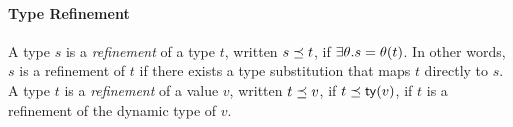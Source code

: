 \paragraph{Type Refinement}
A type $s$ is a \emph{refinement} of a type $t$, written ${s} \preceq {t}$,
if $\exists \theta. s = \theta(t)$.
%
In other words, $s$ is a refinement of $t$ if there exists a type
substitution that maps $t$ directly to $s$.
%
A type $t$ is a \emph{refinement} of a value $v$, written ${t} \preceq {v}$,
if ${t} \preceq {\ensuremath{\mathsf{ty}(v)}}$, \ie if $t$ is a refinement of the
dynamic type of $v$.
%



